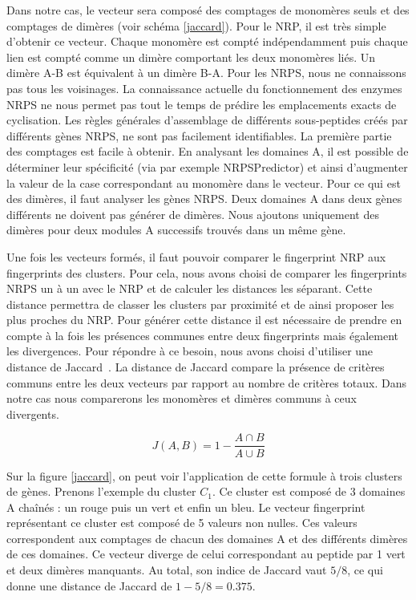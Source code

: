Dans notre cas, le vecteur sera composé des comptages de monomères seuls et des comptages de dimères (voir schéma \ref{jaccard}).
Pour le NRP, il est très simple d'obtenir ce vecteur.
Chaque monomère est compté indépendamment puis chaque lien est compté comme un dimère comportant les deux monomères liés.
Un dimère A-B est équivalent à un dimère B-A.
Pour les NRPS, nous ne connaissons pas tous les voisinages.
La connaissance actuelle du fonctionnement des enzymes NRPS ne nous permet pas tout le temps de prédire les emplacements exacts de cyclisation.
Les règles générales d'assemblage de différents sous-peptides créés par différents gènes NRPS, ne sont pas facilement identifiables.
La première partie des comptages est facile à obtenir.
En analysant les domaines A, il est possible de déterminer leur spécificité (via par exemple NRPSPredictor) et ainsi d'augmenter la valeur de la case correspondant au monomère dans le vecteur.
Pour ce qui est des dimères, il faut analyser les gènes NRPS.
Deux domaines A dans deux gènes différents ne doivent pas générer de dimères.
Nous ajoutons uniquement des dimères pour deux modules A successifs trouvés dans un même gène.


Une fois les vecteurs formés, il faut pouvoir comparer le fingerprint NRP aux fingerprints des clusters.
Pour cela, nous avons choisi de comparer les fingerprints NRPS un à un avec le NRP et de calculer les distances les séparant.
Cette distance permettra de classer les clusters par proximité et de ainsi proposer les plus proches du NRP.
Pour générer cette distance il est nécessaire de prendre en compte à la fois les présences communes entre deux fingerprints mais également les divergences.
Pour répondre à ce besoin, nous avons choisi d'utiliser une distance de Jaccard~\cite{jaccard_etude_1901}.
La distance de Jaccard compare la présence de critères communs entre les deux vecteurs par rapport au nombre de critères totaux.
Dans notre cas nous comparerons les monomères et dimères communs à ceux divergents.

\begin{equation}
  J(A,B) = 1 - \frac{A \cap B}{A \cup B}
\end{equation}

Sur la figure \ref{jaccard}, on peut voir l'application de cette formule à trois clusters de gènes.
Prenons l'exemple du cluster $C_1$.
Ce cluster est composé de 3 domaines A chaînés : un rouge puis un vert et enfin un bleu.
Le vecteur fingerprint représentant ce cluster est composé de 5 valeurs non nulles.
Ces valeurs correspondent aux comptages de chacun des domaines A et des différents dimères de ces domaines.
Ce vecteur diverge de celui correspondant au peptide par 1 vert et deux dimères manquants.
Au total, son indice de Jaccard vaut $5 / 8$, ce qui donne une distance de Jaccard de $1 - 5/8 = 0.375$.





